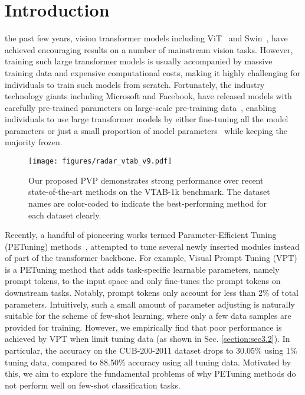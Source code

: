 \documentclass[10pt,journal,letterpaper,compsoc]{IEEEtran}
\begin{document}
\maketitle
\IEEEdisplaynotcompsoctitleabstractindextext
\IEEEpeerreviewmaketitle



\section{Introduction} \label{intro}

 the past few years, vision transformer models including ViT~\cite{vit} and Swin~\cite{swin}, have achieved encouraging results on a number of mainstream vision tasks. However, training such large transformer models is usually accompanied by massive training data and expensive computational costs, making it highly challenging for individuals to train such models from scratch. Fortunately, the industry technology giants including Microsoft and Facebook, have released models with carefully pre-trained parameters on large-scale pre-training data~\cite{russakovsky2015imagenet}, enabling individuals to use large transformer models by either fine-tuning all the model parameters or just a small proportion of model parameters~\cite{2014How,2016Unsupervised,sidetune,BitFit,adapterfusion,adapterhub} while keeping the majority frozen.


\begin{figure}
    \centering
    \texttt{[image: figures/radar\_vtab\_v9.pdf]}

    \caption{Our proposed PVP demonstrates  strong performance over recent state-of-the-art methods on the VTAB-1k benchmark. The dataset names are color-coded to indicate the best-performing method for each dataset clearly.
    }
    \label{fig:radar_vtab}
\end{figure}

Recently, a handful of pioneering works termed Parameter-Efficient Tuning (PETuning) methods~\cite{vpt,adapter,NOAH,convbypass,SSF,FacT}, attempted to tune several newly inserted modules instead of part of the transformer backbone. For example, Visual Prompt Tuning (VPT)~\cite{vpt} is a PETuning method that adds task-specific learnable parameters, namely prompt tokens, to the input space and only fine-tunes the prompt tokens on downstream tasks. Notably, prompt tokens only account for less than 2$\%$ of total parameters. Intuitively, such a small amount of parameter adjusting is naturally suitable for the scheme of few-shot learning, where only a few data samples are provided for training. However, we empirically find that poor performance is achieved by VPT when limit tuning data (as shown in Sec. \ref{section:sec3.2}). In particular, the accuracy on the CUB-200-2011 dataset drops to 30.05$\%$ using 1$\%$ tuning data, compared to 88.50$\%$ accuracy using all tuning data. Motivated by this, we aim to explore the fundamental problems of why PETuning methods do not perform well on few-shot classification tasks.
\end{document}
